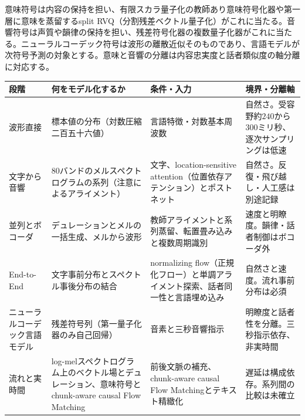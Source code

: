 \documentclass[lualatex,a4paper,10pt]{jlreq}
\begin{document}
意味符号は内容の保持を担い、有限スカラ量子化の教師あり意味符号化器や第一層に意味を蒸留するsplit RVQ（分割残差ベクトル量子化）がこれに当たる\autocite{btd133,btd134}。音響符号は声質や韻律の保持を担い、残差符号化器の複数量子化器がこれに当たる\autocite{btd058}。ニューラルコーデック符号は波形の離散近似そのものであり、言語モデルが次符号予測の対象とする\autocite{btd058,btd061}。意味と音響の分離は内容忠実度と話者類似度の軸分離に対応する\autocite{btd057,btd058}。

\begin{center}
\small
\begin{tabularx}{\textwidth}{@{}p{}p{}p{}X@{}}
\toprule
段階 & 何をモデル化するか & 条件・入力 & 境界・分離軸 \\
\midrule
波形直接\autocite{btd051} & 標本値の分布（対数圧縮二百五十六値） & 言語特徴・対数基本周波数 & 自然さ。受容野約$240$から$300$ミリ秒、逐次サンプリングは低速 \\
文字から音響\autocite{btd052,btd053} & 80バンドのメルスペクトログラムの系列（注意によるアライメント） & 文字、location-sensitive attention（位置依存アテンション）とポストネット & 自然さ。反復・飛び越し・人工感は別途記録 \\
並列とボコーダ\autocite{btd054,btd055} & デュレーションとメルの一括生成、メルから波形 & 教師アライメントと系列蒸留、転置畳み込みと複数周期識別 & 速度と明瞭度。韻律・話者制御はボコーダ外 \\
End-to-End\autocite{btd056,btd057} & 文字事前分布とスペクトル事後分布の結合 & normalizing flow（正規化フロー）と単調アライメント探索、話者同一性と言語埋め込み & 自然さと速度。流れ事前分布は必須 \\
ニューラルコーデック言語モデル\autocite{btd058} & 残差符号列（第一量子化器のみ自己回帰） & 音素と三秒音響指示 & 明瞭度と話者性を分離。三秒指示依存、非実時間 \\
流れと実時間\autocite{btd060,btd132,btd133} & log-melスペクトログラム上のベクトル場とデュレーション、意味符号とchunk-aware causal Flow Matching & 前後文脈の補充、chunk-aware causal Flow Matchingとテキスト精緻化 & 遅延は構成依存。系列間の比較は未確立 \\
\bottomrule
\end{tabularx}
\end{center}
\end{document}
